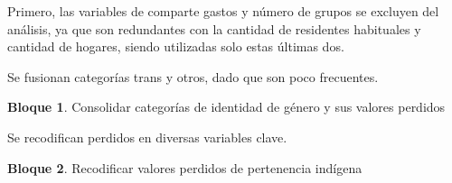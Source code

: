 \documentclass[]{book}
\newenvironment{Shaded}{\begin{snugshade}}{\end{snugshade}}
\newcommand{\DecValTok}[1]{\textcolor[rgb]{0.00,0.00,0.81}{#1}}
\newcommand{\KeywordTok}[1]{\textcolor[rgb]{0.13,0.29,0.53}{\textbf{#1}}}
\newcommand{\NormalTok}[1]{#1}
\newcommand{\OperatorTok}[1]{\textcolor[rgb]{0.81,0.36,0.00}{\textbf{#1}}}
\newcommand{\OtherTok}[1]{\textcolor[rgb]{0.56,0.35,0.01}{#1}}
\newcommand{\StringTok}[1]{\textcolor[rgb]{0.31,0.60,0.02}{#1}}
\theoremstyle{definition}
\theoremstyle{definition}
\newtheorem{example}{Bloque}[chapter]
\theoremstyle{definition}
\theoremstyle{definition}
\theoremstyle{remark}
\begin{document}
Primero, las variables de comparte gastos y número de grupos se excluyen del análisis, ya que son redundantes con la cantidad de residentes habituales y cantidad de hogares, siendo utilizadas solo estas últimas dos.

Se fusionan categorías trans y otros, dado que son poco frecuentes.

\begin{example}
\protect\hypertarget{exm:bloque29nbm}{}{\label{exm:bloque29nbm} }Consolidar categorías de identidad de género y sus valores perdidos
\end{example}

\begin{Shaded}
\end{Shaded}

Se recodifican perdidos en diversas variables clave.

\begin{example}
\protect\hypertarget{exm:bloque30nbm}{}{\label{exm:bloque30nbm} }Recodificar valores perdidos de pertenencia indígena
\end{example}

\begin{Shaded}
\end{Shaded}
\end{document}
